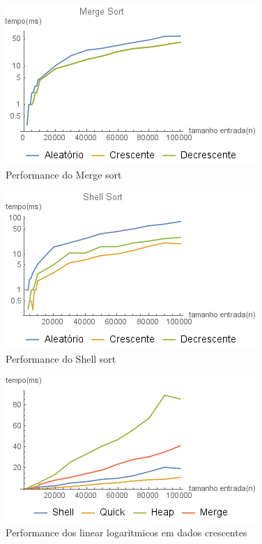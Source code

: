 \documentclass[a4paper, 12pt]{report}
\begin{document}
\begin{figure}[htb]
\centering
\includegraphics[width=.9\linewidth]{./img/merge_all.png}
\caption{Performance do Merge sort}
\end{figure}

\begin{figure}[htb]
\centering
\includegraphics[width=.9\linewidth]{./img/shell_all.png}
\caption{Performance do Shell sort}
\end{figure}

\begin{figure}[htb]
\centering
\includegraphics[width=.9\linewidth]{./img/logarithmic_crescent.png}
\caption{\small Performance dos linear logaritmicos em dados crescentes}
\end{figure}
\end{document}
